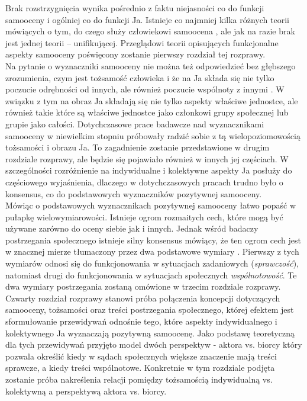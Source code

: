\documentclass[man]{apa6}
\begin{document}
Brak rozstrzygnięcia wynika pośrednio z faktu niejasności co do funkcji samooceny i ogólniej co do funkcji Ja. Istnieje co najmniej kilka różnych teorii mówiących o tym, do czego służy człowiekowi samoocena \parencite[np., ][]{leary1995self, pyszczynski2004people}, ale jak na razie brak jest jednej teorii -- unifikującej. Przeglądowi teorii opisujących funkcjonalne aspekty samooceny poświęcony zostanie pierwszy rozdział tej rozprawy.\\

Na pytanie o wyznaczniki samooceny nie można też odpowiedzieć bez głębszego zrozumienia, czym jest tożsamość człowieka i że na Ja składa się nie tylko poczucie odrębności od innych, ale również poczucie wspólnoty z innymi \parencite[np.,][]{brewer1996we}. W związku z tym na obraz Ja składają się nie tylko aspekty właściwe jednostce, ale również takie które są właściwe jednostce jako członkowi grupy społecznej lub grupie jako całości. Dotychczasowe prace badawcze nad wyznacznikami samooceny w niewielkim stopniu próbowały radzić sobie z tą wielopoziomowością tożsamości i obrazu Ja. To zagadnienie zostanie przedstawione w drugim rozdziale rozprawy, ale będzie się pojawiało również w innych jej częściach. W szczególności rozróżnienie na indywidualne i kolektywne aspekty Ja posłuży do częściowego wyjaśnienia, dlaczego w dotychczasowych pracach trudno było o konsensus, co do podstawowych wyznaczników pozytywnej samooceny.\\

Mówiąc o podstawowych wyznacznikach pozytywnej samooceny łatwo popaść w pułapkę wielowymiarowości. Istnieje ogrom rozmaitych cech, które mogą być używane zarówno do oceny siebie jak i innych. Jednak wśród badaczy postrzegania społecznego istnieje silny konsensus mówiący, że ten ogrom cech jest w znacznej mierze tłumaczony przez dwa podstawowe wymiary \parencite{judd2005fundamental, fiske2007universal}. Pierwszy z tych wymiarów odnosi się do funkcjonowania w sytuacjach zadaniowych (\emph{sprawczość}), natomiast drugi do funkcjonowania w sytuacjach społecznych \emph{wspólnotowość}. Te dwa wymiary postrzegania zostaną omówione w trzecim rozdziale rozprawy.\\

Czwarty rozdział rozprawy stanowi próba połączenia koncepcji dotyczących samooceny, tożsamości oraz treści postrzegania społecznego, której efektem jest sformułowanie przewidywań odnośnie tego, które aspekty indywidualnego i kolektywnego Ja wyznaczają pozytywną samoocenę. Jako podstawę teoretyczną dla tych przewidywań przyjęto model dwóch perspektyw - aktora vs. biorcy \parencite{abele2014communal} który pozwala określić kiedy w sądach społecznych większe znaczenie mają treści sprawcze, a kiedy treści wspólnotowe. Konkretnie w tym rozdziale podjęta zostanie próba nakreślenia relacji pomiędzy tożsamością indywidualną vs. kolektywną a perspektywą aktora vs. biorcy.\\
\end{document}
